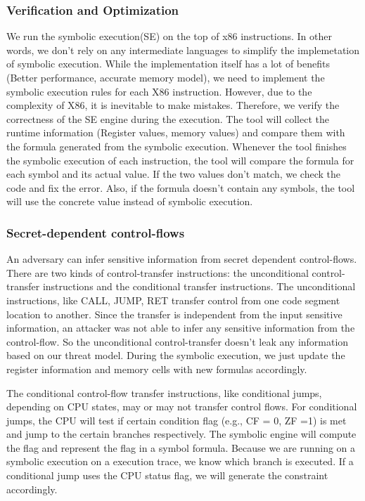 \subsubsection{Verification and Optimization}
We run the symbolic execution(SE) on the top of x86 instructions.
In other words, we don’t rely on any intermediate languages to 
simplify the implemetation of symbolic execution. 
While the implementation itself 
has a lot of benefits (Better performance, accurate memory model), 
we need to implement the symbolic execution 
rules for each X86 instruction. 
However, due to the complexity of X86, it is inevitable to make mistakes. 
Therefore, we verify the correctness of the SE engine during the execution. 
The tool will collect the runtime information (Register values, 
memory values) and compare them with the formula generated from the 
symbolic execution. Whenever the tool finishes the symbolic execution 
of each instruction, the tool will compare the formula for each symbol 
and its actual value. If the two values don't match, we check the code
and fix the error. Also, if the formula doesn't contain any symbols,
the tool will use the concrete value instead of symbolic execution.

\subsubsection{Secret-dependent control-flows}
An adversary can infer sensitive information from secret dependent control-flows. 
There are two kinds of control-transfer instructions: the unconditional 
control-transfer instructions and the conditional transfer instructions.
The unconditional instructions, like CALL, JUMP, RET transfer control
from one code segment location to another. Since the transfer is 
independent from the input sensitive information, an attacker was 
not able to infer any sensitive information from the control-flow. 
So the unconditional control-transfer doesn't leak any information 
based on our threat model. During the symbolic execution, 
we just update the register information and memory cells with 
new formulas accordingly.

The conditional control-flow transfer instructions, like conditional jumps,
depending on CPU states, may or may not transfer control flows.
For conditional jumps, the CPU will test if certain condition flag 
(e.g., CF = 0, ZF =1) is met and jump to the certain branches respectively.
The symbolic engine will compute the flag and represent the flag 
in a symbol formula. Because we are running on a symbolic execution 
on a execution trace, we know which branch is executed.
If a conditional jump uses the CPU status flag, we will generate 
the constraint accordingly.

